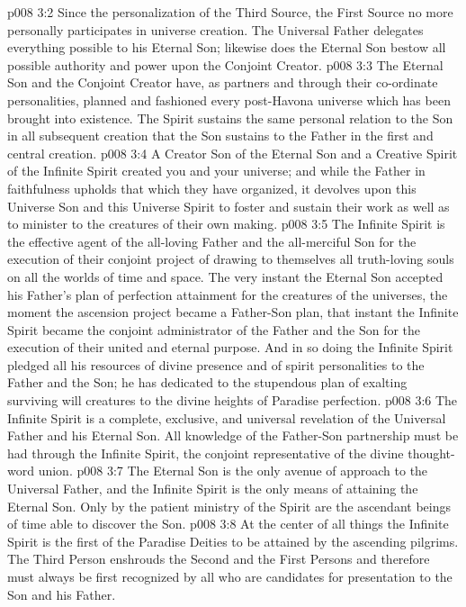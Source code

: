 \vs p008 3:2 Since the personalization of the Third Source, the First Source no more personally participates in universe creation. The Universal Father delegates everything possible to his Eternal Son; likewise does the Eternal Son bestow all possible authority and power upon the Conjoint Creator.
\vs p008 3:3 The Eternal Son and the Conjoint Creator have, as partners and through their co\hyp{}ordinate personalities, planned and fashioned every post\hyp{}Havona universe which has been brought into existence. The Spirit sustains the same personal relation to the Son in all subsequent creation that the Son sustains to the Father in the first and central creation.
\vs p008 3:4 A Creator Son of the Eternal Son and a Creative Spirit of the Infinite Spirit created you and your universe; and while the Father in faithfulness upholds that which they have organized, it devolves upon this Universe Son and this Universe Spirit to foster and sustain their work as well as to minister to the creatures of their own making.
\vs p008 3:5 \pc The Infinite Spirit is the effective agent of the all\hyp{}loving Father and the all\hyp{}merciful Son for the execution of their conjoint project of drawing to themselves all truth\hyp{}loving souls on all the worlds of time and space. The very instant the Eternal Son accepted his Father’s plan of perfection attainment for the creatures of the universes, the moment the ascension project became a Father\hyp{}Son plan, that instant the Infinite Spirit became the conjoint administrator of the Father and the Son for the execution of their united and eternal purpose. And in so doing the Infinite Spirit pledged all his resources of divine presence and of spirit personalities to the Father and the Son; he has dedicated  to the stupendous plan of exalting surviving will creatures to the divine heights of Paradise perfection.
\vs p008 3:6 The Infinite Spirit is a complete, exclusive, and universal revelation of the Universal Father and his Eternal Son. All knowledge of the Father\hyp{}Son partnership must be had through the Infinite Spirit, the conjoint representative of the divine thought\hyp{}word union.
\vs p008 3:7 The Eternal Son is the only avenue of approach to the Universal Father, and the Infinite Spirit is the only means of attaining the Eternal Son. Only by the patient ministry of the Spirit are the ascendant beings of time able to discover the Son.
\vs p008 3:8 At the center of all things the Infinite Spirit is the first of the Paradise Deities to be attained by the ascending pilgrims. The Third Person enshrouds the Second and the First Persons and therefore must always be first recognized by all who are candidates for presentation to the Son and his Father.
